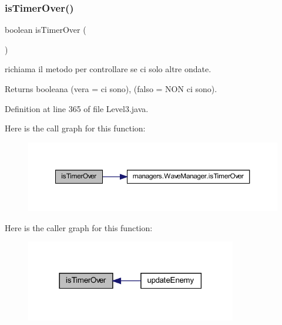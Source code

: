 \subsubsection{\texorpdfstring{is\+Timer\+Over()}{isTimerOver()}}
{\footnotesize\ttfamily boolean is\+Timer\+Over (\begin{DoxyParamCaption}{ }\end{DoxyParamCaption})\hspace{0.3cm}{\ttfamily [private]}}



richiama il metodo per controllare se ci solo altre ondate. 

\begin{DoxyReturn}{Returns}
booleana (vera = ci sono), (falso = N\+ON ci sono). 
\end{DoxyReturn}


Definition at line 365 of file Level3.\+java.

Here is the call graph for this function\+:
\nopagebreak
\begin{figure}[H]
\begin{center}
\leavevmode
\includegraphics[width=350pt]{classscenes_1_1_level3_ab68417e6738c05037923f5f0f21eb586_cgraph}
\end{center}
\end{figure}
Here is the caller graph for this function\+:\nopagebreak
\begin{figure}[H]
\begin{center}
\leavevmode
\includegraphics[width=261pt]{classscenes_1_1_level3_ab68417e6738c05037923f5f0f21eb586_icgraph}
\end{center}
\end{figure}
\mbox{\label{classscenes_1_1_level3_aa12eb1084be2c4d9b03d5f248f00900d}} 
